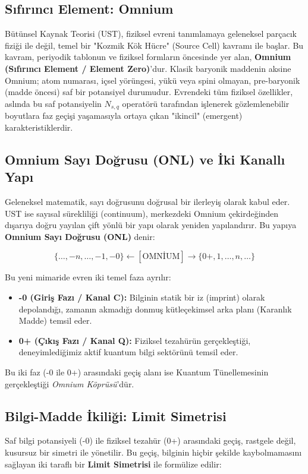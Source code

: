 \subsection{Sıfırıncı Element: Omnium}
Bütünsel Kaynak Teorisi (UST), fiziksel evreni tanımlamaya geleneksel parçacık fiziği ile değil, temel bir "Kozmik Kök Hücre" (Source Cell) kavramı ile başlar. Bu kavram, periyodik tablonun ve fiziksel formların öncesinde yer alan, \textbf{Omnium (Sıfırıncı Element / Element Zero)}'dur. Klasik baryonik maddenin aksine Omnium; atom numarası, içsel yörüngesi, yükü veya spini olmayan, pre-baryonik (madde öncesi) saf bir potansiyel durumudur. Evrendeki tüm fiziksel özellikler, aslında bu saf potansiyelin $N_{s,q}$ operatörü tarafından işlenerek gözlemlenebilir boyutlara faz geçişi yaşamasıyla ortaya çıkan "ikincil" (emergent) karakteristiklerdir.

\subsection{Omnium Sayı Doğrusu (ONL) ve İki Kanallı Yapı}
Geleneksel matematik, sayı doğrusunu doğrusal bir ilerleyiş olarak kabul eder. UST ise sayısal sürekliliği (continuum), merkezdeki Omnium çekirdeğinden dışarıya doğru yayılan çift yönlü bir yapı olarak yeniden yapılandırır. Bu yapıya \textbf{Omnium Sayı Doğrusu (ONL)} denir:

\begin{equation}
\{ \dots, -n, \dots, -1, -0 \} \longleftarrow [\text{OMNİUM}] \longrightarrow \{ 0+, 1, \dots, n, \dots \}
\end{equation}

Bu yeni mimaride evren iki temel faza ayrılır:
\begin{itemize}
    \item \textbf{-0 (Giriş Fazı / Kanal C):} Bilginin statik bir iz (imprint) olarak depolandığı, zamanın akmadığı donmuş kütleçekimsel arka planı (Karanlık Madde) temsil eder.
    \item \textbf{0+ (Çıkış Fazı / Kanal Q):} Fiziksel tezahürün gerçekleştiği, deneyimlediğimiz aktif kuantum bilgi sektörünü temsil eder.
\end{itemize}
Bu iki faz (-0 ile 0+) arasındaki geçiş alanı ise Kuantum Tünellemesinin gerçekleştiği \textit{Omnium Köprüsü}'dür.

\subsection{Bilgi-Madde İkiliği: Limit Simetrisi}
Saf bilgi potansiyeli (-0) ile fiziksel tezahür (0+) arasındaki geçiş, rastgele değil, kusursuz bir simetri ile yönetilir. Bu geçiş, bilginin hiçbir şekilde kaybolmamasını sağlayan iki taraflı bir \textbf{Limit Simetrisi} ile formülize edilir:

